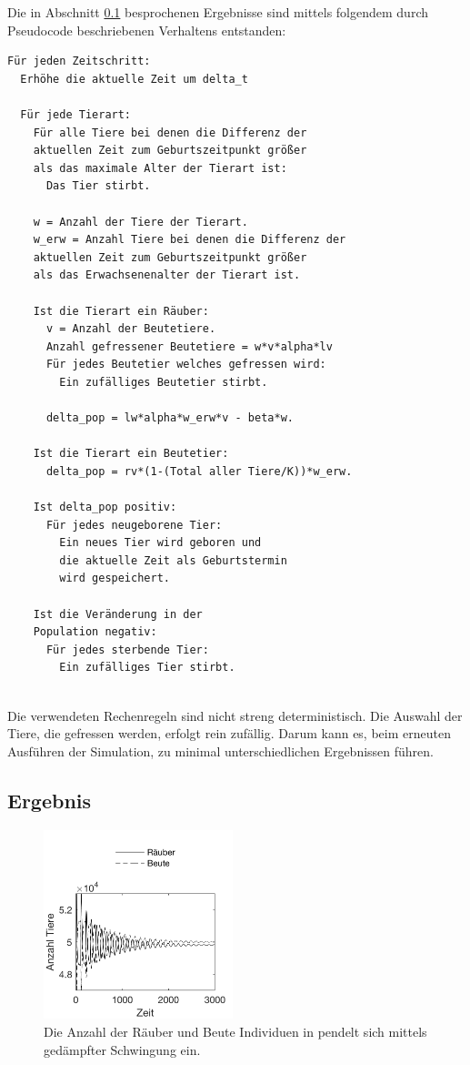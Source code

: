 \documentclass[a4paper,twoside]{article}
\begin{document}
	\newpage	
	
	Die in Abschnitt \ref{sec:Ergebnis_Agent_Model} besprochenen Ergebnisse sind mittels folgendem durch Pseudocode beschriebenen Verhaltens entstanden:
	
	\begin{small}
	\begin{verbatim}
Für jeden Zeitschritt:
  Erhöhe die aktuelle Zeit um delta_t

  Für jede Tierart:
    Für alle Tiere bei denen die Differenz der
    aktuellen Zeit zum Geburtszeitpunkt größer
    als das maximale Alter der Tierart ist:
      Das Tier stirbt.

    w = Anzahl der Tiere der Tierart.
    w_erw = Anzahl Tiere bei denen die Differenz der
    aktuellen Zeit zum Geburtszeitpunkt größer
    als das Erwachsenenalter der Tierart ist.

    Ist die Tierart ein Räuber:
      v = Anzahl der Beutetiere.
      Anzahl gefressener Beutetiere = w*v*alpha*lv
      Für jedes Beutetier welches gefressen wird:
        Ein zufälliges Beutetier stirbt.
            
      delta_pop = lw*alpha*w_erw*v - beta*w.

    Ist die Tierart ein Beutetier:
      delta_pop = rv*(1-(Total aller Tiere/K))*w_erw.

    Ist delta_pop positiv:
      Für jedes neugeborene Tier:
        Ein neues Tier wird geboren und 
        die aktuelle Zeit als Geburtstermin 
        wird gespeichert.

    Ist die Veränderung in der
    Population negativ:
      Für jedes sterbende Tier:
        Ein zufälliges Tier stirbt.	
 		
	\end{verbatim}
	\end{small}
	
	Die verwendeten Rechenregeln sind nicht streng deterministisch. Die Auswahl der Tiere, die gefressen werden, erfolgt rein zufällig. Darum kann es, beim erneuten Ausführen der Simulation, zu minimal unterschiedlichen Ergebnissen führen.
	
	\subsection{Ergebnis}\label{sec:Ergebnis_Agent_Model}
	
	\begin{figure}[!h]
  		\centering
 		\includegraphics[width=5.5cm]{Diagramme/agent_model_damped.png}
  		\caption{Die Anzahl der Räuber und Beute Individuen in pendelt sich mittels gedämpfter Schwingung ein.}
  		\label{fig:agent_model_damped}
	\end{figure}
	
\end{document}
